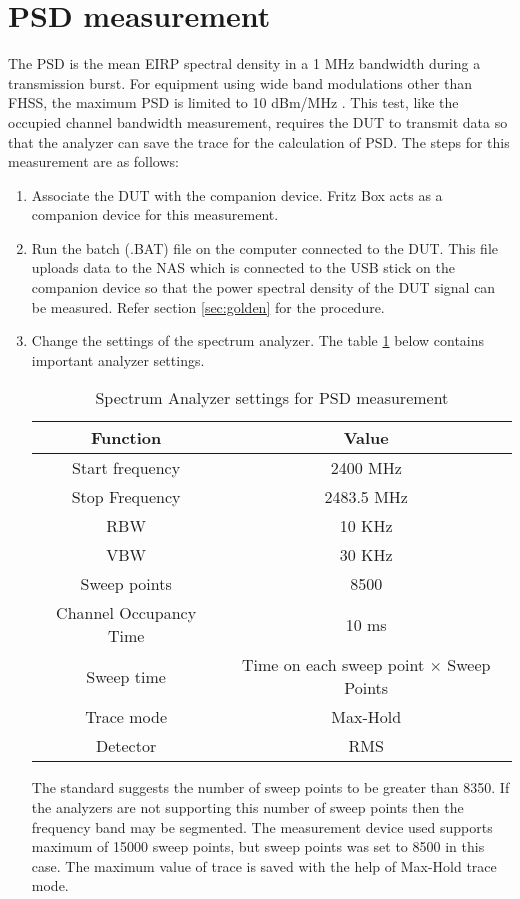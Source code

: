 \section{\acl{PSD} measurement}
\label{sec:psdmeas}
The \acl{PSD} is the mean \acf{EIRP} spectral density in a 1 MHz bandwidth during a transmission burst. For equipment using wide band modulations other than \acs{FHSS}, the maximum \acf{PSD} is limited to 10 dBm/MHz \cite{etsi300328}. This test, like the occupied channel bandwidth measurement, requires the \acs{DUT} to transmit data so that the analyzer can save the trace for the calculation of \acf{PSD}. The steps for this measurement are as follows:

\begin{enumerate}
  \item Associate the \acs{DUT} with the companion device. Fritz Box acts as a companion device for this measurement. 
\item Run the batch (.BAT) file on the computer connected to the \acs{DUT}. This file uploads data to the \ac{NAS} which is connected to the USB stick on the companion device so that the power spectral density of the \acs{DUT} signal can be measured. Refer section \ref{sec:golden} for the procedure.
\item Change the settings of the spectrum analyzer. The table \ref{tab:analyzerpsd} below contains important analyzer settings.
\begin{table}[H]
\begin{center}
\begin {tabular} {|c|c|} 
\toprule
Function & Value \\ 
\midrule 
Start frequency & 2400 MHz \\
Stop Frequency  & 2483.5 MHz\\
\ac{RBW} & 10 KHz \\
\ac{VBW} & 30 KHz\\
Sweep points & 8500 \\
Channel Occupancy Time & 10 ms \\
Sweep time & Time on each sweep point $\times$ Sweep Points \\
Trace mode & Max-Hold \\
Detector & \ac{RMS}\\
\bottomrule
\end{tabular} 
\caption{Spectrum Analyzer settings for \ac{PSD} measurement}
\label{tab:analyzerpsd}
\end{center}
\end{table}
The standard suggests the number of sweep points to be greater than 8350. If the analyzers are not supporting this number of sweep points then the frequency band may be segmented. The measurement device used supports maximum of 15000 sweep points, but sweep points was set to 8500 in this case. The maximum value of trace is saved with the help of Max-Hold trace mode. 
  

\end{enumerate}
